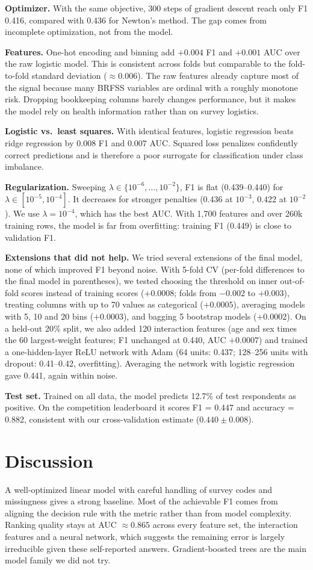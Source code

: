 \documentclass[10pt,conference,compsocconf]{IEEEtran}
\begin{document}
\textbf{Optimizer.} With the same objective, 300 steps of gradient descent
reach only F1 0.416, compared with 0.436 for Newton's method. The gap comes
from incomplete optimization, not from the model.

\textbf{Features.} One-hot encoding and binning add $+0.004$ F1 and $+0.001$
AUC over the raw logistic model. This is consistent across folds but
comparable to the fold-to-fold standard deviation ($\approx0.006$). The raw
features already capture most of the signal because many BRFSS variables are
ordinal with a roughly monotone risk. Dropping bookkeeping columns barely
changes performance, but it makes the model rely on health information
rather than on survey logistics.

\textbf{Logistic vs.\ least squares.} With identical features, logistic
regression beats ridge regression by $0.008$ F1 and $0.007$ AUC. Squared loss
penalizes confidently correct predictions and is therefore a poor surrogate
for classification under class imbalance.

\textbf{Regularization.} Sweeping $\lambda\in\{10^{-6},\dots,10^{-2}\}$, F1
is flat (0.439--0.440) for $\lambda\in[10^{-5},10^{-4}]$. It decreases for
stronger penalties (0.436 at $10^{-3}$, 0.422 at $10^{-2}$). We use
$\lambda=10^{-4}$, which has the best AUC. With 1{,}700 features and over
260k training rows, the model is far from overfitting: training F1 (0.449)
is close to validation F1.

\textbf{Extensions that did not help.} We tried several extensions of the
final model, none of which improved F1 beyond noise. With 5-fold CV
(per-fold differences to the final model in parentheses), we tested
choosing the threshold on inner out-of-fold scores instead of training
scores ($+0.0008$; folds from $-0.002$ to $+0.003$), treating columns with
up to 70 values as categorical ($+0.0005$), averaging models with 5, 10
and 20 bins ($+0.0003$), and bagging 5 bootstrap models ($+0.0002$). On a
held-out 20\% split, we also added 120 interaction features (age and sex
times the 60 largest-weight features; F1 unchanged at 0.440, AUC $+0.0007$)
and trained a one-hidden-layer ReLU network with Adam (64 units: 0.437;
128--256 units with dropout: 0.41--0.42, overfitting). Averaging the network
with logistic regression gave 0.441, again within noise.

\textbf{Test set.} Trained on all data, the model predicts 12.7\% of test
respondents as positive. On the competition leaderboard it scores
F1 = 0.447 and accuracy = 0.882, consistent with our cross-validation
estimate ($0.440\pm0.008$).

\section{Discussion}
A well-optimized linear model with careful handling of survey codes and
missingness gives a strong baseline. Most of the achievable F1 comes from
aligning the decision rule with the metric rather than from model
complexity. Ranking quality stays at AUC $\approx0.865$ across every
feature set, the interaction features and a neural network, which suggests
the remaining error is largely irreducible given these self-reported
answers. Gradient-boosted trees are the main model family we did not try.
\end{document}
